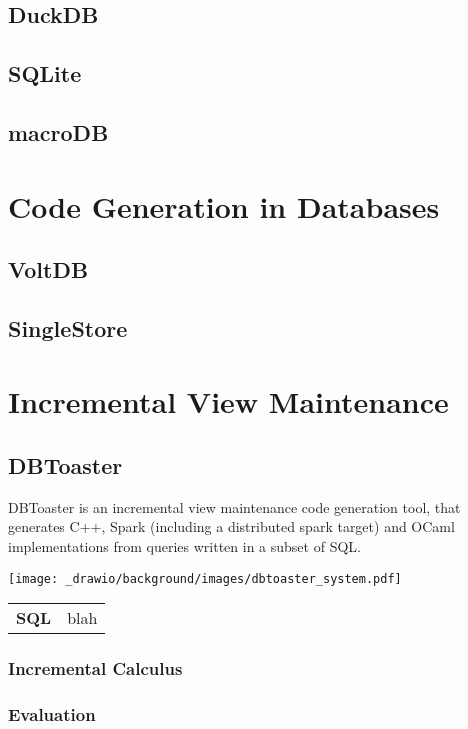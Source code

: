 \subsection{DuckDB}
\subsection{SQLite}
\subsection{macroDB}

\section{Code Generation in Databases}
\subsection{VoltDB}
\subsection{SingleStore}

\section{Incremental View Maintenance}

\subsection{DBToaster}
DBToaster is an incremental view maintenance code generation tool, that generates C++, Spark (including a distributed spark target) and OCaml implementations from queries written in a subset of SQL.
\begin{center}
    \texttt{[image: \_drawio/background/images/dbtoaster\_system.pdf]}
\end{center}

\begin{center}
    \begin{tabular}{l p{}}
        \textbf{SQL} & blah \\
    \end{tabular}
\end{center}
\subsubsection{Incremental Calculus}
\subsubsection{Evaluation}




